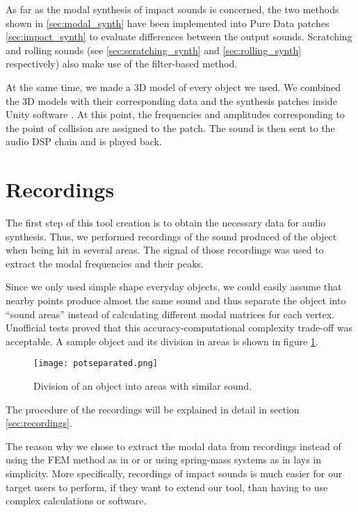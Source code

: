 As far as the modal synthesis of impact sounds is concerned, the two methods shown in \ref{sec:modal_synth} have been implemented into Pure Data patches \ref{sec:impact_synth} to evaluate differences between the output sounds. Scratching and rolling sounds (see \ref{sec:scratching_synth} and \ref{sec:rolling_synth} respectively) also make use of the filter-based method.

 At the same time, we made a 3D model of every object we used. We combined the 3D models with their corresponding data and the synthesis patches inside Unity\textsuperscript{\textregistered} software \cite{bib:unity}. At this point, the frequencies and amplitudes corresponding to the point of collision are assigned to the patch. The sound is then sent to the audio DSP chain and is played back. 

\section{Recordings}
The first step of this tool creation is to obtain the necessary data for audio synthesis. Thus, we performed recordings of the sound produced of the object when being hit in several areas. The signal of those recordings was used to extract the modal frequencies and their peaks. 

Since we only used simple shape everyday objects, we could easily assume that nearby points produce almost the same sound and thus separate the object into ``sound areas'' instead of calculating different modal matrices for each vertex. Unofficial tests proved that this accuracy-computational complexity trade-off was acceptable. A sample object and its division in areas is shown in figure \ref{fig:pot_sep}.

\begin{figure}[H]
  \centering
    \texttt{[image: potseparated.png]}
      \caption{Division of an object into areas with similar sound.}
      \label{fig:pot_sep}
\end{figure} 

The procedure of the recordings will be explained in detail in section \ref{sec:recordings}.

The reason why we chose to extract the modal data from recordings instead of using the FEM method as in \cite{director2001synthesizing} or \cite{o2002synthesizing} or using spring-mass systems as in \cite{raghuvanshi2006interactive} lays in simplicity. More specifically, recordings of impact sounds is much easier for our target users to perform, if they want to extend our tool, than having to use complex calculations or software.

